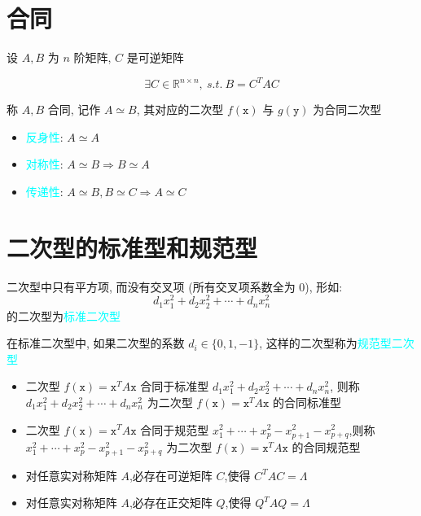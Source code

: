 \section{合同}

\begin{definition}[矩阵合同]
	设 $A,B$ 为 $n$ 阶矩阵, $C$ 是可逆矩阵

	$$\exists C\in \mathbb{R}^{n\times n},\ s.t.\ B = C^{T}AC$$
	
	称 $A,B$ 合同, 记作 $A\simeq B$, 其对应的二次型 $f(\mathtt{x})$ 与 $g(\mathtt{y})$ 为合同二次型
\end{definition}
\begin{corollary}[合同]
	\begin{itemize}
		\item \textcolor{cyan}{反身性}: $A\simeq A$
		\item \textcolor{cyan}{对称性}: $A\simeq B \Rightarrow B\simeq A$
		\item \textcolor{cyan}{传递性}: $A\simeq B, B\simeq C \Rightarrow A\simeq C$
	\end{itemize}
\end{corollary}

\section{二次型的标准型和规范型}

\begin{definition}[标准型]
	二次型中只有平方项, 而没有交叉项 (所有交叉项系数全为 $0$), 形如:  
	$$d_{1}x_{1}^{2} + d_{2}x_{2}^{2} + \cdots + d_{n}x_{n}^{2}$$
	的二次型为\textcolor{cyan}{标准二次型}
\end{definition}

\begin{definition}[规范型]
	在标准二次型中, 如果二次型的系数 $d_{i} \in \{0, 1, -1\}$, 这样的二次型称为\textcolor{cyan}{规范型二次型}
\end{definition}

\begin{corollary}[合同标准型和合同规范型]
	\begin{itemize}
		\item 二次型 $f(\mathtt{x}) = \mathtt{x}^{T}A\mathtt{x}$ 合同于标准型 $d_{1}x_{1}^{2} + d_{2}x_{2}^{2} + \cdots + d_{n}x_{n}^{2}$, 则称 $d_{1}x_{1}^{2} + d_{2}x_{2}^{2} + \cdots + d_{n}x_{n}^{2}$ 为二次型 $f(\mathtt{x}) = \mathtt{x}^{T}A\mathtt{x}$ 的合同标准型
		\item 二次型 $f(\mathtt{x}) = \mathtt{x}^{T}A\mathtt{x}$ 合同于规范型 $x_{1}^{2} + \cdots + x_{p}^{2} - x_{p+1}^{2} - x_{p+q}^{2}$,则称 $x_{1}^{2} + \cdots + x_{p}^2 - x_{p+1}^{2} - x_{p+q}^{2}$ 为二次型 $f(\mathtt{x}) = \mathtt{x}^{T}A\mathtt{x}$ 的合同规范型
		\item 对任意实对称矩阵 $A$,必存在可逆矩阵 $C$,使得 $C^{T}AC=\varLambda$
		\item 对任意实对称矩阵 $A$,必存在正交矩阵 $Q$,使得 $Q^{T}AQ=\varLambda$
	\end{itemize}
\end{corollary}

